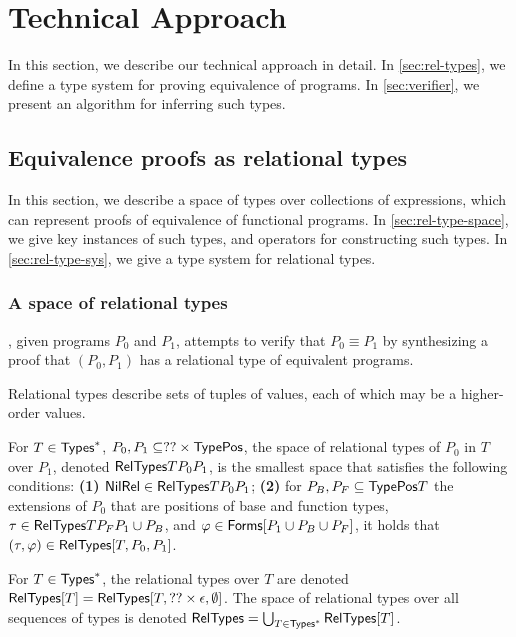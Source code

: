 \section{Technical Approach}
%
In this section, we describe our technical approach in detail.
%
In \autoref{sec:rel-types}, we define a type system for proving
equivalence of programs.
%
In \autoref{sec:verifier}, we present an algorithm for inferring such
types.

\subsection{Equivalence proofs as relational types}
\label{sec:rel-types}
%
In this section, we describe a space of types over collections of
expressions, which can represent proofs of equivalence of functional
programs.
%
In \autoref{sec:rel-type-space}, we give key instances of such types,
and operators for constructing such types.
%
In \autoref{sec:rel-type-sys}, we give a type system for relational
types.

\subsubsection{A space of relational types}
\label{sec:rel-type-space}
%
\sys, given programs $P_0$ and $P_1$, attempts to verify that $P_0
\equiv P_1$ by synthesizing a proof that $(P_0, P_1)$ has a relational
type of equivalent programs.

Relational types describe sets of tuples of values, each of which may
be a higher-order values.
%
%
\begin{defn}
  \label{defn:rel-type}
  For $T \in \mathsf{Types}^{*}$, $P_0, P_1 \subseteq ?? \times \mathsf{TypePos}$, the
  space of relational types of $P_0$ in $T$ over $P_1$, denoted
  $\mathsf{RelTypes}{ T }{ P_0 }{ P_1 }$, is the smallest space that satisfies
  the following conditions:
  \textbf{(1)} $\mathsf{NilRel} \in \mathsf{RelTypes}{ T }{ P_0 }{ P_1 }$;
  \textbf{(2)} for $P_B, P_F \subseteq \mathsf{TypePos}{ T }$ the extensions
  of $P_0$ that are positions of base and function types, %
  $\tau \in \mathsf{RelTypes}{ T }{ P_F }{ P_1 \cup P_B }$, and %
  $\varphi \in \mathsf{Forms}[  P_1 \cup P_B \cup P_F  ]$, it holds that
  $(\tau, \varphi) \in \mathsf{RelTypes}[  T ,  P_0 ,  P_1  ]$.
\end{defn}
%
For $T \in \mathsf{Types}^{*}$, the relational types over $T$ are denoted
$\mathsf{RelTypes}[  T  ] = \mathsf{RelTypes}[  T ,  ?? \times \epsilon , 
  \emptyset  ]$.
%
%
The space of relational types over all sequences of types is denoted
$\mathsf{RelTypes} = \bigcup_{T \in \mathsf{Types}^{*} } \mathsf{RelTypes}[ T ]$.

